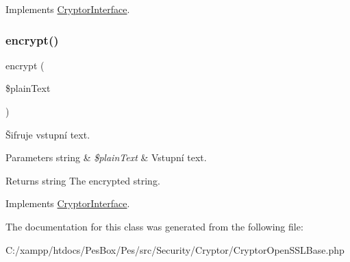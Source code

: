 Implements \mbox{\hyperlink{interface_pes_1_1_security_1_1_cryptor_1_1_cryptor_interface}{Cryptor\+Interface}}.

\mbox{\label{class_pes_1_1_security_1_1_cryptor_1_1_cryptor_open_s_s_l_base_a1dd4de135736b6fb90d21c7f6f354909}} 
\subsubsection{\texorpdfstring{encrypt()}{encrypt()}}
{\footnotesize\ttfamily encrypt (\begin{DoxyParamCaption}\item[{}]{\$plain\+Text }\end{DoxyParamCaption})}

Šifruje vstupní text. 
\begin{DoxyParams}[1]{Parameters}
string & {\em \$plain\+Text} & Vstupní text. \\
\hline
\end{DoxyParams}
\begin{DoxyReturn}{Returns}
string The encrypted string. 
\end{DoxyReturn}


Implements \mbox{\hyperlink{interface_pes_1_1_security_1_1_cryptor_1_1_cryptor_interface}{Cryptor\+Interface}}.



The documentation for this class was generated from the following file\+:\begin{DoxyCompactItemize}
\item 
C\+:/xampp/htdocs/\+Pes\+Box/\+Pes/src/\+Security/\+Cryptor/Cryptor\+Open\+S\+S\+L\+Base.\+php\end{DoxyCompactItemize}
